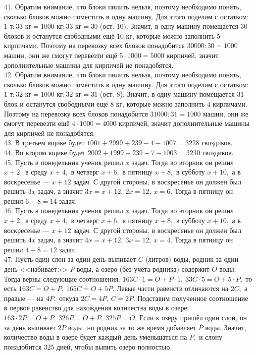 \documentclass[12pt]{article}
\begin{document}
41. Обратим внимание, что блоки пилить нельзя, поэтому необходимо понять, сколько блоков можно поместить в одну машину. Для этого поделим с остатком:
$1\text{ т}:33\text{ кг}=1000\text{ кг}:33\text{ кг}=30$ (ост. 10). Значит, в одну машину помещается 30 блоков и останутся свободными ещё 10 кг, которые можно заполнить 5 кирпичами. Поэтому на перевозку всех блоков понадобится $30000:30=1000$ машин, они же смогут перевезти ещё $5\cdot1000=5000$ кирпичей, значит дополнительные машины для кирпичей не понадобятся.\\
42. Обратим внимание, что блоки пилить нельзя, поэтому необходимо понять, сколько блоков можно поместить в одну машину. Для этого поделим с остатком:
$1\text{ т}:32\text{ кг}=1000\text{ кг}:32\text{ кг}=31$ (ост. 8). Значит, в одну машину помещается 31 блок и останутся свободными ещё 8 кг, которые можно заполнить 4 кирпичами. Поэтому на перевозку всех блоков понадобится $31000:31=1000$ машин, они же смогут перевезти ещё $4\cdot1000=4000$ кирпичей, значит дополнительные машины для кирпичей не понадобятся.\\
43. В третьем ящике будет $1001+2999+239-4-1007=3228$ гвоздиков.\\
44. Во втором ящике будет $2002+1999+239-7-1003=3230$ гвоздиков.\\
45. Пусть в понедельник ученик решил $x$ задач. Тогда во вторник он решил $x+2,$ в среду $x+4,$ в четверг $x+6,$ в пятницу $x+8,$ в субботу $x+10,$ а в воскресенье --- $x+12$ задач. С другой стороны, в воскресенье он должен был решить $3x$ задач, а значит $3x=x+12,\ 2x=12,\ x=6.$ Тогда в пятницу он решил $6+8=14$ задач.\\
46. Пусть в понедельник ученик решил $x$ задач. Тогда во вторник он решил $x+2,$ в среду $x+4,$ в четверг $x+6,$ в пятницу $x+8,$ в субботу $x+10,$ а в воскресенье --- $x+12$ задач. С другой стороны, в воскресенье он должен был решить $4x$ задач, а значит $4x=x+12,\ 3x=12,\ x=4.$ Тогда в пятницу он решил $4+8=12$ задач.\\
47. Пусть один слон за один день выпивает $C$ (литров) воды, родник за один день <<набивает>> $P$ воды, а озеро (без учёта родника) содержит $O$ воды. Тогда верны следующие соотношения: $163C\cdot1=O+P\cdot1,\ 33C\cdot5=O+5\cdot P,$ то есть $163C=O+P,\ 165C=O+5P.$ Левые части равенств отличаются на $2C,$ а правые --- на $4P,$ откуда $2C=4P,\ C=2P.$ Подставим полученное соотношение в первое равенство для нахождения количества воды в озере: $163\cdot2P=O+P,\ 326P=O+P,\ 325P=O.$ Если к озеру пришёл один слон, он за день выпивает $2P$ воды, но родник за то же время добавляет $P$ воды. Значит, количество воды в озере будет каждый день уменьшаться на $P,$ и слону понадобится 325 дней, чтобы выпить озеро полностью.\\
\end{document}
